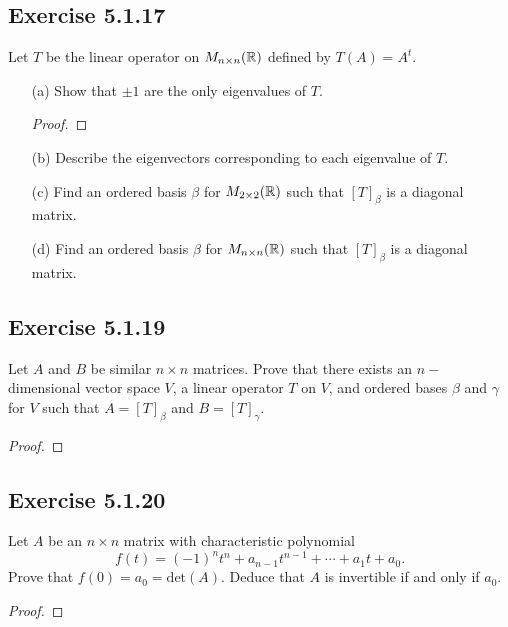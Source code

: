 \subsection*{Exercise  5.1.17} Let \( T  \) be the linear operator on \( {M}_{n \times n}(\mathbb{R} ) \) defined by \( T(A) = A^{t} \).
\begin{enumerate}
    \item[(a)] Show that \( \pm 1  \) are the only eigenvalues of \( T  \).
        \begin{proof}
        
        \end{proof}
    \item[(b)] Describe the eigenvectors corresponding to each eigenvalue of \( T  \).
        \begin{solution}
        
        \end{solution}
    \item[(c)] Find an ordered basis \( \beta  \) for \( {M}_{2 \times 2 }(\mathbb{R} ) \) such that \( [T]_{\beta} \) is a diagonal matrix.
        \begin{solution}
        
        \end{solution}
    \item[(d)] Find an ordered basis \( \beta  \) for \( {M}_{n \times n}(\mathbb{R}) \) such that \( [T]_{\beta} \) is a diagonal matrix.
        \begin{solution}
        
        \end{solution}
\end{enumerate}

\subsection*{Exercise 5.1.19} Let \( A  \) and \( B  \) be similar \( n \times n  \) matrices. Prove that there exists an \( n- \)dimensional vector space \( V  \), a linear operator \( T  \) on \( V  \), and ordered bases \( \beta  \) and \( \gamma \) for \( V  \) such that \( A = [T]_{\beta}  \) and \( B = [T]_{\gamma} \). %
\begin{proof}

\end{proof}

\subsection*{Exercise 5.1.20} Let \( A  \) be an \( n \times n  \) matrix with characteristic polynomial 
\[  f(t) = (-1)^{n} t^{n} + {a}_{n-1} t^{n-1} + \cdots + {a}_{1} t + {a}_{0}. \]
Prove that \( f(0) = {a}_{0} = \text{det}(A) \). Deduce that \( A  \) is invertible if and only if \( {a}_{0} \). %
\begin{proof}

\end{proof}

